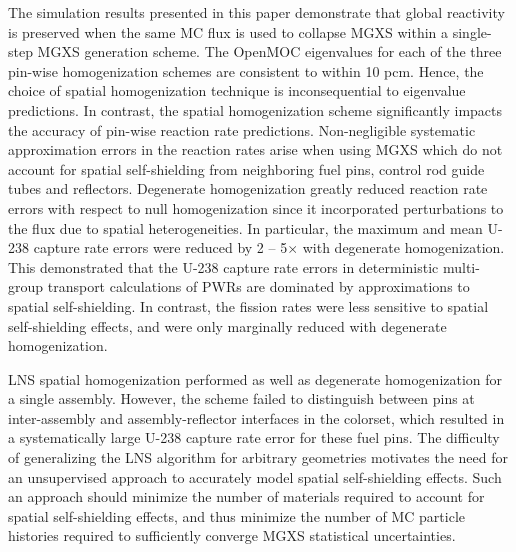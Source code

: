 The simulation results presented in this paper demonstrate that global reactivity is preserved when the same MC flux is used to collapse MGXS within a single-step MGXS generation scheme. The OpenMOC eigenvalues for each of the three pin-wise homogenization schemes are consistent to within 10 pcm. Hence, the choice of spatial homogenization technique is inconsequential to eigenvalue predictions. In contrast, the spatial homogenization scheme significantly impacts the accuracy of pin-wise reaction rate predictions. Non-negligible systematic approximation errors in the reaction rates arise when using MGXS which do not account for spatial self-shielding from neighboring fuel pins, control rod guide tubes and reflectors. Degenerate homogenization greatly reduced reaction rate errors with respect to null homogenization since it incorporated perturbations to the flux due to spatial heterogeneities. In particular, the maximum and mean U-238 capture rate errors were reduced by 2 -- 5$\times$ with degenerate homogenization. This demonstrated that the U-238 capture rate errors in deterministic multi-group transport calculations of PWRs are dominated by approximations to spatial self-shielding. In contrast, the fission rates were less sensitive to spatial self-shielding effects, and were only marginally reduced with degenerate homogenization.

LNS spatial homogenization performed as well as degenerate homogenization for a single assembly. However, the scheme failed to distinguish between pins at inter-assembly and assembly-reflector interfaces in the colorset, which resulted in a systematically large U-238 capture rate error for these fuel pins. The difficulty of generalizing the LNS algorithm for arbitrary geometries motivates the need for an unsupervised approach to accurately model spatial self-shielding effects. Such an approach should minimize the number of materials required to account for spatial self-shielding effects, and thus minimize the number of MC particle histories required to sufficiently converge MGXS statistical uncertainties.


